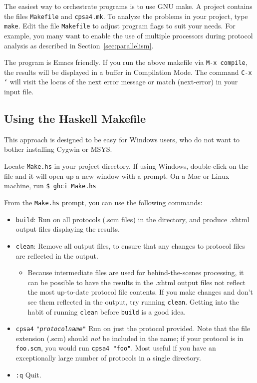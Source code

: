 The easiest way to orchestrate {\cpsa} programs is to use GNU make.  A
{\cpsa} project contains the files \texttt{Makefile} and
\texttt{cpsa4.mk}.  To analyze the problems in your project, type
\texttt{make}.  Edit the file \texttt{Makefile} to adjust program
flags to suit your needs.  For example, you many want to enable the
use of multiple processors during protocol analysis as described in
Section~\ref{sec:parallelism}.

The {\cpsa} program is Emacs friendly. If you run the above makefile
via \texttt{M-x compile}, the results will be displayed in a buffer in
Compilation Mode. The command \texttt{C-x `} will visit the locus of
the next error message or match (next-error) in your {\cpsa} input
file.

\subsection{Using the Haskell Makefile}

This approach is designed to be easy for Windows users, who do not want
to bother installing Cygwin or MSYS.

Locate \texttt{Make.hs} in your project directory. If using Windows,
double-click on the file and it will open up a new window with a
prompt. On a Mac or Linux machine, run \texttt{\$ ghci Make.hs}

From the \texttt{Make.hs} prompt, you can use the following commands:

\begin{itemize}
\item \texttt{build}: Run {\cpsa} on all protocols (.scm files) in the
  directory, and produce .xhtml output files displaying the results.
\item \texttt{clean}: Remove all {\cpsa} output files, to ensure that any
  changes to protocol files are reflected in the output.
\begin{itemize}
\item Because intermediate files are used for behind-the-scenes
  processing, it can be possible to have the results in the .xhtml
  output files not reflect the most up-to-date protocol file
  contents. If you make changes and don't see them reflected in the
  output, try running \texttt{clean}. Getting into the habit of
  running \texttt{clean} before \texttt{build} is a good idea.
\end{itemize}
\item \texttt{cpsa4} \texttt{"\textit{protocolname}"} Run {\cpsa} on just the
  protocol provided. Note that the file extension (.scm) should
  \textit{not} be included in the name; if your protocol is in
  \texttt{foo.scm}, you would run \texttt{cpsa4 "foo"}. Most useful if you
  have an exceptionally large number of protocols in a single
  directory.
\item \texttt{:q} Quit.
\end{itemize}

